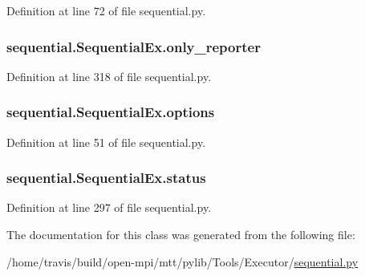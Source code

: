 Definition at line 72 of file sequential.\-py.

\hypertarget{classsequential_1_1SequentialEx_a7c81be8b211e0e01022948ce0a7d4e19}{
\subsubsection[{only\-\_\-reporter}]{\setlength{\rightskip}{0pt plus 5cm}sequential.\-Sequential\-Ex.\-only\-\_\-reporter}}\label{classsequential_1_1SequentialEx_a7c81be8b211e0e01022948ce0a7d4e19}


Definition at line 318 of file sequential.\-py.

\hypertarget{classsequential_1_1SequentialEx_a72ae94e2c46c2b1b8c5022eaf3593edf}{
\subsubsection[{options}]{\setlength{\rightskip}{0pt plus 5cm}sequential.\-Sequential\-Ex.\-options}}\label{classsequential_1_1SequentialEx_a72ae94e2c46c2b1b8c5022eaf3593edf}


Definition at line 51 of file sequential.\-py.

\hypertarget{classsequential_1_1SequentialEx_a7f8ca8932ced5d9daf6191598894eb58}{
\subsubsection[{status}]{\setlength{\rightskip}{0pt plus 5cm}sequential.\-Sequential\-Ex.\-status}}\label{classsequential_1_1SequentialEx_a7f8ca8932ced5d9daf6191598894eb58}


Definition at line 297 of file sequential.\-py.



The documentation for this class was generated from the following file\-:\begin{DoxyCompactItemize}
\item 
/home/travis/build/open-\/mpi/mtt/pylib/\-Tools/\-Executor/\hyperlink{sequential_8py}{sequential.\-py}\end{DoxyCompactItemize}
